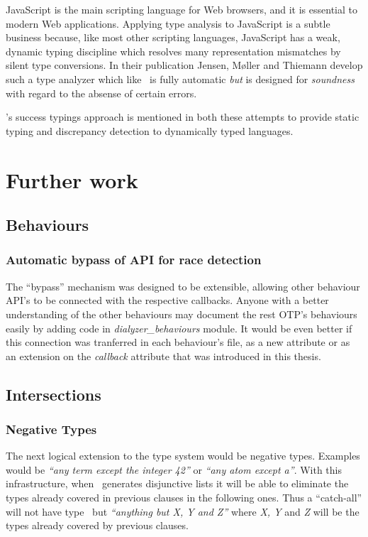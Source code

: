 JavaScript is the main scripting language for Web browsers, and it is
essential to modern Web applications. Applying type analysis to
JavaScript is a subtle business because, like most other scripting
languages, JavaScript has a weak, dynamic typing discipline which
resolves many representation mismatches by silent type conversions. In
their publication\cite{javascript} Jensen, M\o ller and Thiemann
develop such a type analyzer which like \dr\ is fully automatic
\emph{but} is designed for \emph{soundness} with regard to the absense
of certain errors.

\dr's success typings approach is mentioned in both these attempts to
provide static typing and discrepancy detection to dynamically typed
languages.

\section{Further work}
\label{sct:further_work}

\subsection{Behaviours}
\subsubsection{Automatic bypass of API for race detection}

The ``bypass'' mechanism was designed to be extensible, allowing other
behaviour API's to be connected with the respective callbacks. Anyone
with a better understanding of the other behaviours may document the
rest OTP's behaviours easily by adding code in
\emph{dialyzer\_behaviours} module. It would be even better if this
connection was tranferred in each behaviour's file, as a new attribute
or as an extension on the \emph{callback} attribute that was
introduced in this thesis.

\subsection{Intersections}

\subsubsection{Negative Types}
\label{sct:negative_types}

The next logical extension to the type system would be negative
types. Examples would be \emph{``any term except the integer 42''} or
\emph{``any atom except a''}. With this infrastructure, when
\dr\ generates disjunctive lists it will be able to eliminate the
types already covered in previous clauses in the following ones. Thus
a ``catch-all'' will not have type \any\ but \emph{``anything but X, Y
  and Z''} where \emph{X, Y} and \emph{Z} will be the types already
covered by previous clauses.

